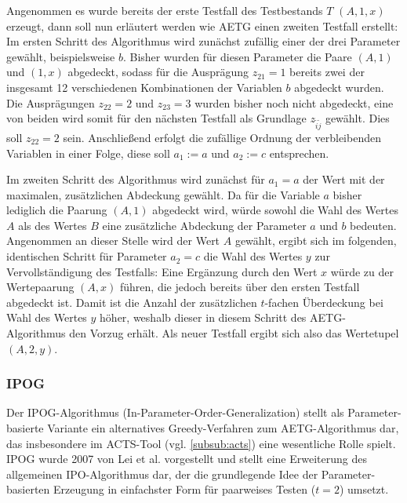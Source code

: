 Angenommen es wurde bereits der erste Testfall des Testbestands $T$ $(A,1,x)$ erzeugt, dann soll nun erläutert werden wie AETG einen zweiten Testfall erstellt: Im ersten Schritt des Algorithmus wird zunächst zufällig einer der drei Parameter gewählt, beispielsweise $b$. Bisher wurden für diesen Parameter die Paare $(A,1)$ und $(1,x)$ abgedeckt, sodass für die Ausprägung $z_{21} = 1$ bereits zwei der insgesamt 12 verschiedenen Kombinationen der Variablen $b$ abgedeckt wurden. Die Ausprägungen $z_{22} = 2$ und $z_{23} = 3$ wurden bisher noch nicht abgedeckt, eine von beiden wird somit für den nächsten Testfall als Grundlage $z_{\tilde{i}\tilde{j}}$ gewählt. Dies soll $z_{22} = 2$ sein. Anschließend erfolgt die zufällige Ordnung der verbleibenden Variablen in einer Folge, diese soll $a_1 := a$ und $a_2 := c$ entsprechen.

Im zweiten Schritt des Algorithmus wird zunächst für $a_1 = a$ der Wert mit der maximalen, zusätzlichen Abdeckung gewählt. Da für die Variable $a$ bisher lediglich die Paarung $(A,1)$ abgedeckt wird, würde sowohl die Wahl des Wertes $A$ als des Wertes $B$ eine zusätzliche Abdeckung der Parameter $a$ und $b$ bedeuten. Angenommen an dieser Stelle wird der Wert $A$ gewählt, ergibt sich im folgenden, identischen Schritt für Parameter $a_2 = c$ die Wahl des Wertes $y$ zur Vervollständigung des Testfalls: Eine Ergänzung durch den Wert $x$ würde zu der Wertepaarung $(A,x)$ führen, die jedoch bereits über den ersten Testfall abgedeckt ist. Damit ist die Anzahl der zusätzlichen $t$-fachen Überdeckung bei Wahl des Wertes $y$ höher, weshalb dieser in diesem Schritt des AETG-Algorithmus den Vorzug erhält. Als neuer Testfall ergibt sich also das Wertetupel $(A, 2, y)$.

\subsubsection{IPOG}\label{subsub:ipog}

Der IPOG-Algorithmus (In-Parameter-Order-Generalization) stellt als Parameter-basierte Variante ein alternatives Greedy-Verfahren zum AETG-Algorithmus dar, das insbesondere im ACTS-Tool (vgl. \autoref{subsub:acts}) eine wesentliche Rolle spielt. IPOG wurde 2007 von Lei et al. \cite{lei2008ipog} vorgestellt und stellt eine Erweiterung des allgemeinen IPO-Algorithmus \cite{lei1998parameter} dar, der die grundlegende Idee der Parameter-basierten Erzeugung in einfachster Form für paarweises Testen ($t=2$) umsetzt.

